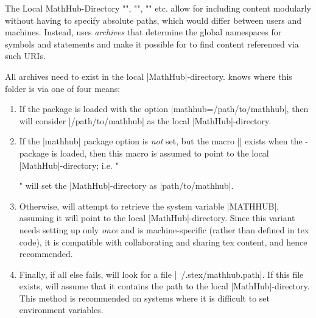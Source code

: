 \begin{sfragment}[id=sec:localmh]{The Local MathHub-Directory}
    \stexcode"\usemodule", \stexcode"\importmodule", 
    \stexcode"" etc. allow for 
    including content modularly without having to specify absolute
    paths, which would differ between users and machines. Instead,
    \sTeX uses \emph{archives} that determine the global
    namespaces for symbols and statements and make it possible
    for \sTeX to find content referenced via such URIs.

    All \sTeX archives need to exist in the local |MathHub|-directory.
    \sTeX knows where this folder is via one of four means:

    \begin{enumerate}
    \item If the \sTeX package is loaded with the option |mathhub=/path/to/mathhub|, then
      \sTeX will consider |/path/to/mathhub| as the local |MathHub|-directory.
    \item If the |mathhub| package option is \emph{not} set, but the macro |\mathhub|
      exists when the \sTeX-package is loaded, then this macro is assumed to point to the
      local |MathHub|-directory; i.e.
      \stexcode"\def\mathhub{/path/to/mathhub}\usepackage{stex}" will set the
      |MathHub|-directory as |path/to/mathhub|.
    \item Otherwise, \sTeX will attempt to retrieve the system variable |MATHHUB|,
      assuming it will point to the local |MathHub|-directory. Since this variant needs
      setting up only \emph{once} and is machine-specific (rather than defined in tex
      code), it is compatible with collaborating and sharing tex content, and hence
      recommended.
    \item Finally, if all else fails, \sTeX will look for a file
      |~/.stex/mathhub.path|. If this file exists, \sTeX will assume that it contains the
      path to the local |MathHub|-directory. This method is recommended on systems where
      it is difficult to set environment variables.
    \end{enumerate}
\end{sfragment}

